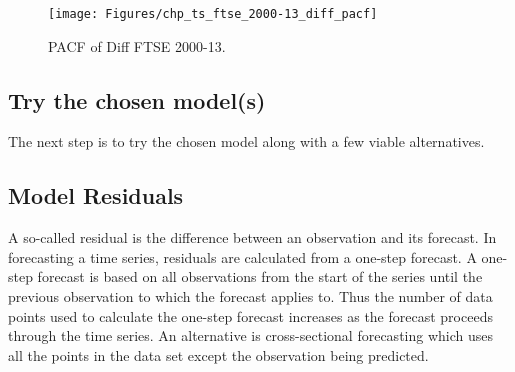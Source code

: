 \begin{figure}[tbh]
\centering
\texttt{[image: Figures/chp\_ts\_ftse\_2000-13\_diff\_pacf]}
\caption[FTSE 2000-13 Diff.]{PACF of Diff FTSE 2000-13.}
\label{fig:chp_ts_ftse_2000-13_diff_pacf}
\end{figure}


\subsection{Try the chosen model(s)}
The next step is to try the chosen model along with a few viable alternatives. 

%
%
%



\subsection{Model Residuals}
A so-called residual is the difference between an observation and its forecast. In forecasting a time series, residuals are calculated from a one-step forecast.  A one-step forecast is based on all observations from the start of the series until the previous observation to which the forecast applies to. Thus the number of data points used to calculate the one-step forecast increases as the forecast proceeds through the time series.  An alternative is cross-sectional forecasting which uses all the points in the data set except the observation being predicted.

